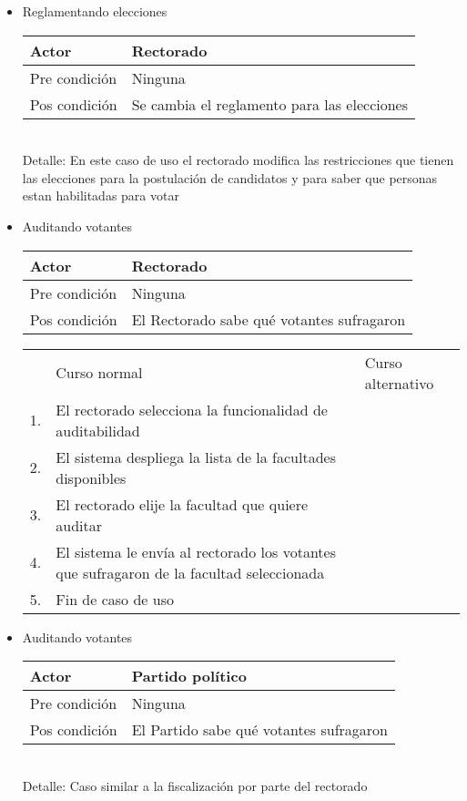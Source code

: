 \begin{itemize}
\bigskip
\item Reglamentando elecciones
\begin{center}
\begin{tabular}{ll}
Actor & Rectorado \\
\hline
Pre condici\'on & Ninguna \\
\hline
Pos condici\'on & Se cambia el reglamento para las elecciones \\
\hline
\end{tabular}
\medskip
\\
Detalle: En este caso de uso el rectorado modifica las restricciones que tienen las elecciones para la postulación de candidatos y para saber que personas estan habilitadas para votar
\end{center}






\bigskip
\item Auditando votantes
\begin{center}
\begin{tabular}{ll}
Actor & Rectorado \\
\hline
Pre condición & Ninguna\\
\hline
Pos condición & El Rectorado sabe qu\'e votantes sufragaron \\
\hline
\end{tabular}
\medskip
\begin{tabular}{c p{4cm}|p{4cm}}
 & Curso normal & Curso alternativo \\
 1. & El rectorado selecciona la funcionalidad de auditabilidad &   \\
 2. & El sistema despliega la lista de la facultades disponibles &   \\
 3. & El rectorado elije la facultad que quiere auditar & \\
 4. & El sistema le env\'ia al rectorado los votantes que sufragaron de la facultad seleccionada \\
 5. & Fin de caso de uso & \\
\end{tabular}
\end{center}  

\bigskip
\item Auditando votantes
\begin{center}
\begin{tabular}{ll}
Actor & Partido político \\
\hline
Pre condición & Ninguna\\
\hline
Pos condición & El Partido sabe qu\'e votantes sufragaron \\
\hline
\end{tabular}
\medskip
\\
Detalle: Caso similar a la fiscalización por parte del rectorado
\end{center} 


\end{itemize}
